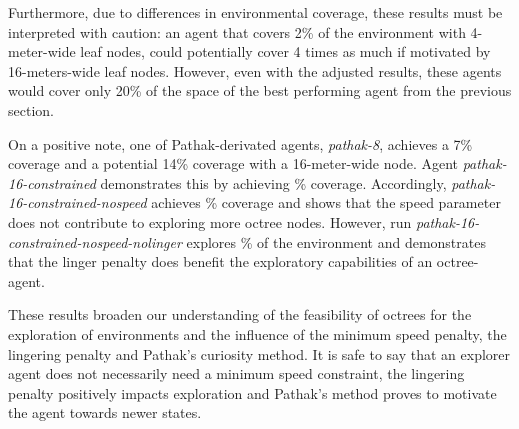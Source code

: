         Furthermore, due to differences in environmental coverage, these results must be interpreted with caution: an agent that covers 2\% of the environment with 4-meter-wide leaf nodes, could potentially cover 4 times as much if motivated by 16-meters-wide leaf nodes.
        However, even with the adjusted results, these agents would cover only 20\% of the space of the best performing agent from the previous section.
        
        On a positive note, one of Pathak-derivated agents, \textit{pathak-8}, achieves a 7\% coverage and a potential 14\% coverage with a 16-meter-wide node. Agent \textit{pathak-16-constrained} demonstrates this by achieving \% coverage. 
        Accordingly, \textit{pathak-16-constrained-nospeed} achieves \% coverage and shows that the speed parameter does not contribute to exploring more octree nodes. 
        However, run \textit{pathak-16-constrained-nospeed-nolinger} explores \% of the environment and demonstrates that the linger penalty does benefit the exploratory capabilities of an octree-agent.
        
        
            
            
            
    
        These results broaden our understanding of the feasibility of octrees for the exploration of environments and the influence of the minimum speed penalty, the lingering penalty and Pathak's curiosity method. It is safe to say that an explorer agent does not necessarily need a minimum speed constraint, the lingering penalty positively impacts exploration and Pathak's method proves to motivate the agent towards newer states. 

